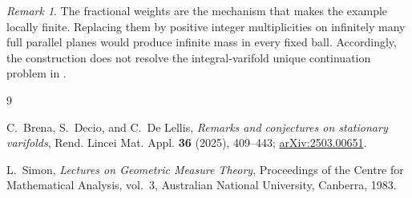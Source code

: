 \documentclass[11pt]{article}
\theoremstyle{remark}
\newtheorem{remark}[theorem]{Remark}
\begin{document}
\begin{remark}
The fractional weights are the mechanism that makes the example locally
finite.  Replacing them by positive integer multiplicities on infinitely
many full parallel planes would produce infinite mass in every fixed ball.
Accordingly, the construction does not resolve the integral-varifold unique
continuation problem in \cite{BDD}.
\end{remark}

\begin{thebibliography}{9}

C.~Brena, S.~Decio, and C.~De Lellis,
\emph{Remarks and conjectures on stationary varifolds},
Rend. Lincei Mat. Appl. \textbf{36} (2025), 409--443;
\href{https://arxiv.org/abs/2503.00651}{arXiv:2503.00651}.

L.~Simon,
\emph{Lectures on Geometric Measure Theory},
Proceedings of the Centre for Mathematical Analysis, vol.~3,
Australian National University, Canberra, 1983.

\end{thebibliography}
\end{document}
